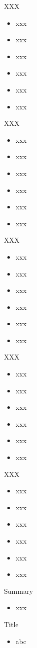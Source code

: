 \begin{frame}[fragile]{XXX}
\begin{itemize}
\item xxx
\item xxx
\item xxx
\item xxx
\item xxx
\item xxx
\end{itemize}
\end{frame}

\begin{frame}[fragile]{XXX}
\begin{itemize}
\item xxx
\item xxx
\item xxx
\item xxx
\item xxx
\item xxx
\end{itemize}
\end{frame}

\begin{frame}[fragile]{XXX}
\begin{itemize}
\item xxx
\item xxx
\item xxx
\item xxx
\item xxx
\item xxx
\end{itemize}
\end{frame}

\begin{frame}[fragile]{XXX}
\begin{itemize}
\item xxx
\item xxx
\item xxx
\item xxx
\item xxx
\item xxx
\end{itemize}
\end{frame}

\begin{frame}[fragile]{XXX}
\begin{itemize}
\item xxx
\item xxx
\item xxx
\item xxx
\item xxx
\item xxx
\end{itemize}
\end{frame}





\begin{frame}[fragile]{Summary}
\begin{itemize}
\item xxx
\end{itemize}
\end{frame}




\begin{frame}[fragile]{Title}
\begin{itemize}
\item abc
\end{itemize}
\end{frame}
